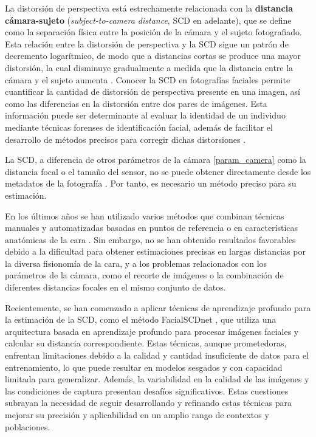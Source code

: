 La distorsión de perspectiva está estrechamente relacionada con la \textbf{distancia cámara-sujeto} (\textit{subject-to-camera distance}, SCD en adelante), que se define como la separación física entre la posición de la cámara y el sujeto fotografiado. Esta relación entre la distorsión de perspectiva y la SCD sigue un patrón de decremento logarítmico, de modo que a distancias cortas se produce una mayor distorsión, la cual disminuye gradualmente a medida que la distancia entre la cámara y el sujeto aumenta \cite{55}. Conocer la SCD en fotografías faciales permite cuantificar la cantidad de distorsión de perspectiva presente en una imagen, así como las diferencias en la distorsión entre dos pares de imágenes. Esta información puede ser determinante al evaluar la identidad de un individuo mediante técnicas forenses de identificación facial, además de facilitar el desarrollo de métodos precisos para corregir dichas distorsiones \cite{16}.

La SCD, a diferencia de otros parámetros de la cámara \ref{param_camera} como la distancia focal o el tamaño del sensor, no se puede obtener directamente desde los metadatos de la fotografía \cite{8}. Por tanto, es necesario un método preciso para su estimación.

En los últimos años se han utilizado varios métodos que combinan técnicas manuales y automatizadas basadas en puntos de referencia o en características anatómicas de la cara \cite{28,30,20}. Sin embargo, no se han obtenido resultados favorables debido a la dificultad para obtener estimaciones precisas en largas distancias por la diversa fisionomía de la cara, y a los problemas relacionados con los parámetros de la cámara, como el recorte de imágenes o la combinación de diferentes distancias focales en el mismo conjunto de datos.

Recientemente, se han comenzado a aplicar técnicas de aprendizaje profundo para la estimación de la SCD, como el método FacialSCDnet \cite{14}, que utiliza una arquitectura basada en aprendizaje profundo para procesar imágenes faciales y calcular su distancia correspondiente. Estas técnicas, aunque prometedoras, enfrentan limitaciones debido a la calidad y cantidad insuficiente de datos para el entrenamiento, lo que puede resultar en modelos sesgados y con capacidad limitada para generalizar. Además, la variabilidad en la calidad de las imágenes y las condiciones de captura presentan desafíos significativos. Estas cuestiones subrayan la necesidad de seguir desarrollando y refinando estas técnicas para mejorar su precisión y aplicabilidad en un amplio rango de contextos y poblaciones.

